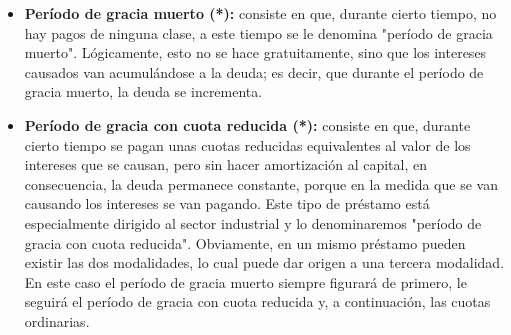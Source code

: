 \begin{itemize}
	\item\textbf{ Período de gracia muerto (*):} consiste en que, durante cierto tiempo, no hay pagos de ninguna clase, a este tiempo se le denomina "período de gracia muerto". Lógicamente, esto no se hace gratuitamente, sino que los intereses causados van acumulándose a la deuda; es decir, que durante el período de gracia muerto, la deuda se incrementa. \\
	\item \textbf{Período de gracia con cuota reducida (*):} consiste en que, durante cierto tiempo se pagan unas cuotas reducidas equivalentes al valor de los intereses que se causan, pero sin hacer amortización al capital, en consecuencia, la deuda permanece constante, porque en la medida que se van causando los intereses se van pagando. Este tipo de préstamo está especialmente dirigido al sector industrial y lo denominaremos "período de gracia con cuota reducida". Obviamente, en un mismo préstamo pueden existir las dos modalidades, lo cual puede dar origen a una tercera modalidad. En este caso el período de gracia muerto siempre figurará de primero, le seguirá el período de gracia con cuota reducida y, a continuación, las cuotas ordinarias.\\
\end{itemize}




